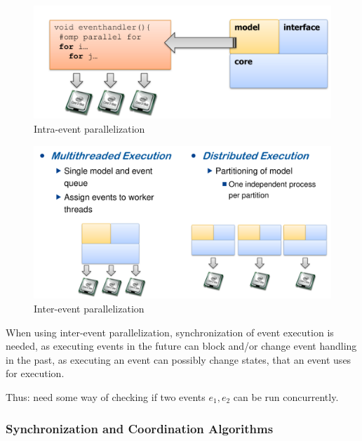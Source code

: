 \documentclass[english]{panikzettel}
\begin{document}
	\begin{halfboxl}
		\begin{figure}[H]
			\centering
			\includegraphics[width=\textwidth]{img/5-intra-para.png}
			\caption{Intra-event parallelization}
			\label{img-5-intra-para}
		\end{figure}
	\end{halfboxl}%
	\begin{halfboxr}
		\begin{figure}[H]
			\centering
			\includegraphics[width=\textwidth]{img/5-inter-para.png}
			\caption{Inter-event parallelization}
			\label{img-5-inter-para}
		\end{figure}
	\end{halfboxr}

	When using inter-event parallelization, synchronization of event execution is needed, as executing events in the future can block and/or change event handling in the past, as executing an event can possibly change states, that an event uses for execution.
	
	Thus: need some way of checking if two events \( e_{1}, e_{2} \) can be run concurrently.

	\subsubsection{Synchronization and Coordination Algorithms}
	\label{sss:parallel-des:synchronization-and-coordination-algorithms}
	
\end{document}
